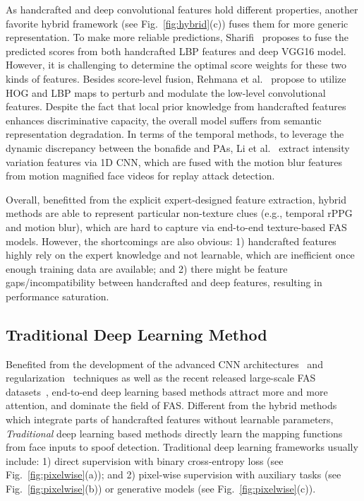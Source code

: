 \documentclass[10pt,journal,compsoc]{IEEEtran}
\begin{document}
As handcrafted and deep convolutional features hold different properties, another favorite hybrid framework (see Fig.~\ref{fig:hybrid}(c)) fuses them for more generic representation. To make more reliable predictions, Sharifi~\cite{sharifi2019score} proposes to fuse the predicted scores from both handcrafted LBP features and deep VGG16 model. However, it is challenging to determine the optimal score weights for these two kinds of features. Besides score-level fusion, Rehmana et al.~\cite{rehman2019perturbing,rehman2020enhancing} propose to utilize HOG and LBP maps to perturb and modulate the low-level convolutional features. Despite the fact that local prior knowledge from handcrafted features enhances discriminative capacity, the overall model suffers from semantic representation degradation. In terms of the temporal methods, to leverage the dynamic discrepancy between the bonafide and PAs, Li et al.~\cite{li2019replayed} extract intensity variation features via 1D CNN, which are fused with the motion blur features from motion magnified face videos for replay attack detection. 


Overall, benefitted from the explicit expert-designed feature extraction, hybrid methods are able to represent particular non-texture clues (e.g., temporal rPPG and motion blur), which are hard to capture via end-to-end texture-based FAS models. However, the shortcomings are also obvious: 1) handcrafted features highly rely on the expert knowledge and not learnable, which are inefficient once enough training data are available; and 2) there might be feature gaps/incompatibility between handcrafted and deep features, resulting in performance saturation.



\subsection{Traditional Deep Learning Method}
Benefited from the development of the advanced CNN architectures~\cite{huang2017densely,ronneberger2015u} and regularization~\cite{ioffe2015batch,srivastava2014dropout} techniques as well as the recent released large-scale FAS datasets~\cite{Boulkenafet2017OULU,zhang2020celeba,liu2021contrastive}, end-to-end deep learning based methods attract more and more attention, and dominate the field of FAS. Different from the hybrid methods which integrate parts of handcrafted features without learnable parameters, \textit{Traditional} deep learning based methods directly learn the mapping functions from face inputs to spoof detection. Traditional deep learning frameworks usually include: 1) direct supervision with binary cross-entropy loss (see Fig.~\ref{fig:pixelwise}(a)); and 2) pixel-wise supervision with auxiliary tasks (see Fig.~\ref{fig:pixelwise}(b)) or generative models (see Fig.~\ref{fig:pixelwise}(c)).    
\end{document}
